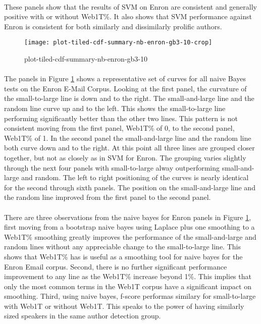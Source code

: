 	\paragraph*{} These panels show that the results of SVM on Enron are consistent and generally positive with or without Web1T\%.  It also shows that SVM performance against Enron is consistent for both similarly and dissimilarly prolific authors.
	
	\begin{figure}[htbp!]
		\begin{center}
		\centering
		\texttt{[image: plot-tiled-cdf-summary-nb-enron-gb3-10-crop]}
		\caption{plot-tiled-cdf-summary-nb-enron-gb3-10}
		\label{fig:plot-tiled-cdf-summary-nb-enron-gb3-10}
		\end{center}
	\end{figure}
	
	\paragraph*{}  The panels in Figure \ref{fig:plot-tiled-cdf-summary-nb-enron-gb3-10} shows a representative set of curves for all naive Bayes tests on the Enron E-Mail Corpus.  Looking at the first panel, the curvature of the small-to-large line is down and to the right.  The small-and-large line and the random line curve up and to the left.  This shows the small-to-large line performing significantly better than the other two lines.  This pattern is not consistent moving from the first panel, Web1T\% of 0, to the second panel, Web1T\% of 1.  In the second panel the small-and-large line and the random line both curve down and to the right.  At this point all three lines are grouped closer together, but not as closely as in SVM for Enron.  The grouping varies slightly through the next four panels with small-to-large alway outperforming small-and-large and random. The left to right positioning of the curves is nearly identical for the second through sixth panels.  The position on the small-and-large line and the random line improved from the first panel to the second panel.  
	\paragraph*{} There are three observations from the naive bayes for Enron panels in Figure \ref{fig:plot-tiled-cdf-summary-nb-enron-gb3-10}, first moving from a bootstrap naive bayes using Laplace plus one smoothing to a Web1T\% smoothing greatly improves the performance of the small-and-large and random lines without any appreciable change to the small-to-large line.  This shows that Web1T\% has is useful as a smoothing tool for naive bayes for the Enron Email corpus.  Second, there is no further significant performance improvement to any line as the Web1T\% increase beyond 1\%.  This implies that only the most common terms in the Web1T corpus have a significant impact on smoothing.  Third, using naive bayes, f-score performas similary for small-to-large with Web1T or without Web1T.  This speaks to the power of having similarly sized speakers in the same author detection group.
	

